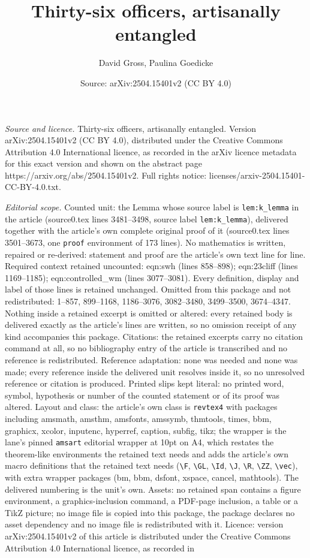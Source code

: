 \documentclass[10pt,a4paper]{amsart}
\title[Thirty-six officers, artisanally entangled]{Thirty-six officers, artisanally entangled}
\author{David Gross, Paulina Goedicke}
\date{Source: arXiv:2504.15401v2 (CC BY 4.0)}
\begin{document}
\maketitle

\noindent\emph{Source and licence.} Thirty-six officers, artisanally entangled. Version arXiv:2504.15401v2 (CC BY 4.0), distributed under the Creative Commons Attribution 4.0 International licence, as recorded in the arXiv licence metadata for this exact version and shown on the abstract page https://arxiv.org/abs/2504.15401v2. Full rights notice: licenses/arxiv-2504.15401-CC-BY-4.0.txt.\par\smallskip

\noindent\textit{Editorial scope.} Counted unit: the Lemma whose source label is \texttt{lem:k\_lemma} in the article (source0.tex lines 3481--3498, source label \texttt{lem:k\_lemma}), delivered together with the article's own complete original proof of it (source0.tex lines 3501--3673, one \texttt{proof} environment of 173 lines). No mathematics is written, repaired or re-derived: statement and proof are the article's own text line for line. Required context retained uncounted: eqn:swh (lines 858--898); eqn:23cliff (lines 1169--1185); eqn:controlled\_wm (lines 3077--3081). Every definition, display and label of those lines is retained unchanged. Omitted from this package and not redistributed: 1--857, 899--1168, 1186--3076, 3082--3480, 3499--3500, 3674--4347. Nothing inside a retained excerpt is omitted or altered: every retained body is delivered exactly as the article's lines are written, so no omission receipt of any kind accompanies this package. Citations: the retained excerpts carry no citation command at all, so no bibliography entry of the article is transcribed and no reference is redistributed. Reference adaptation: none was needed and none was made; every reference inside the delivered unit resolves inside it, so no unresolved reference or citation is produced. Printed slips kept literal: no printed word, symbol, hypothesis or number of the counted statement or of its proof was altered. Layout and class: the article's own class is \texttt{revtex4} with packages including amsmath, amsthm, amsfonts, amssymb, thmtools, times, bbm, graphicx, xcolor, inputenc, hyperref, caption, subfig, tikz; the wrapper is the lane's pinned \texttt{amsart} editorial wrapper at 10pt on A4, which restates the theorem-like environments the retained text needs and adds the article's own macro definitions that the retained text needs (\texttt{\textbackslash F}, \texttt{\textbackslash GL}, \texttt{\textbackslash Id}, \texttt{\textbackslash J}, \texttt{\textbackslash R}, \texttt{\textbackslash ZZ}, \texttt{\textbackslash vec}), with extra wrapper packages (bm, bbm, dsfont, xspace, cancel, mathtools). The delivered numbering is the unit's own. Assets: no retained span contains a figure environment, a graphics-inclusion command, a PDF-page inclusion, a table or a TikZ picture; no image file is copied into this package, the package declares no asset dependency and no image file is redistributed with it. Licence: version arXiv:2504.15401v2 of this article is distributed under the Creative Commons Attribution 4.0 International licence, as recorded in 
\end{document}
